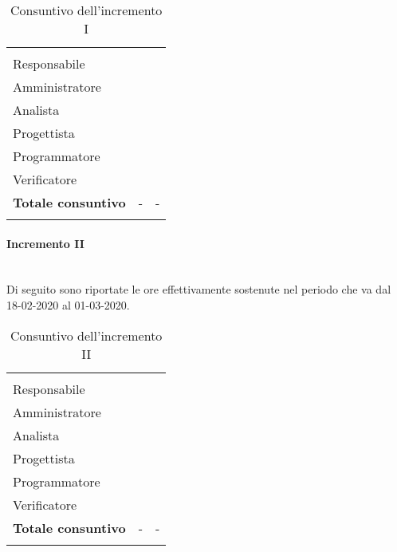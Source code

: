 \begin{longtable}{ C{4cm} C{3cm} C{3.5cm}} 
 	 &
 	 &
 	 \\
 	
 	Responsabile &  & \\
 	Amministratore &  & \\
 	Analista & & \\
 	Progettista & & \\
 	Programmatore & &\\
 	Verificatore & & \\
 	
	\hline 	
 	
 	\textbf{Totale consuntivo} &
	- \color{coloreRosso}{\textbf{(+--)}} &
 	- \\	
 	
 	\caption{Consuntivo dell'incremento I}
\end{longtable}

\paragraph{Incremento II}\mbox{}\\
Di seguito sono riportate le ore effettivamente sostenute nel periodo che va dal 18-02-2020 al 01-03-2020.

\begin{longtable}{ C{4cm} C{3cm} C{3.5cm}} 
 	 &
 	 &
 	 \\
 	
 	Responsabile &  & \\
 	Amministratore &  & \\
 	Analista & & \\
 	Progettista & & \\
 	Programmatore & &\\
 	Verificatore & & \\
 	
	\hline 	
 	
 	\textbf{Totale consuntivo} &
	- \color{coloreRosso}{\textbf{(+--)}} &
 	- \\	
 	
 	\caption{Consuntivo dell'incremento II}
\end{longtable}

